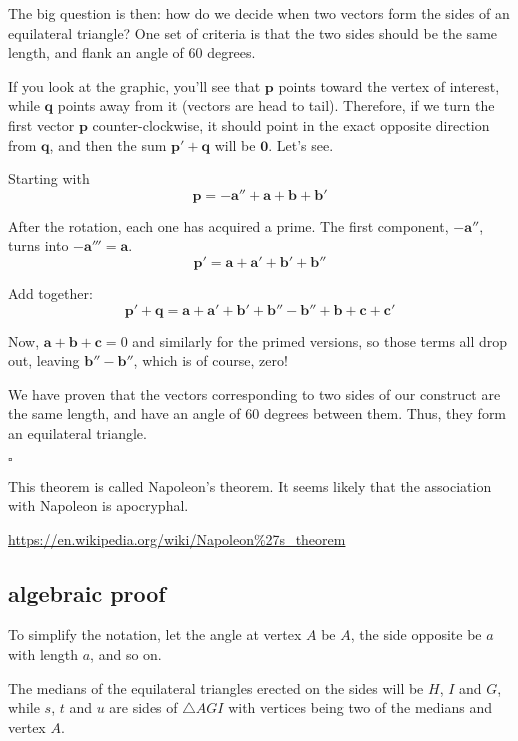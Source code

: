 \documentclass[11pt, oneside]{article}
\begin{document}
The big question is then:  how do we decide when two vectors form the sides of an equilateral triangle?  One set of criteria is that the two sides should be the same length, and flank an angle of 60 degrees.  

If you look at the graphic, you'll see that $\mathbf{p}$ points toward the vertex of interest, while $\mathbf{q}$ points away from it (vectors are head to tail).  Therefore, if we turn the first vector $\mathbf{p}$ counter-clockwise, it should point in the exact opposite direction from $\mathbf{q}$, and then the sum $\mathbf{p'} + \mathbf{q}$ will be $\mathbf{0}$.  Let's see.

Starting with 
\[ \mathbf{p} = \mathbf{-a''} + \mathbf{a} + \mathbf{b} + \mathbf{b'} \]

After the rotation, each one has acquired a prime.  The first component, $\mathbf{-a''}$, turns into $\mathbf{-a'''} = \mathbf{a}$.
\[ \mathbf{p'} = \mathbf{a} + \mathbf{a'} + \mathbf{b'} + \mathbf{b''} \]

Add together:
\[ \mathbf{p'} + \mathbf{q} = \mathbf{a} + \mathbf{a'} + \mathbf{b'} + \mathbf{b''} - \mathbf{b''} + \mathbf{b} + \mathbf{c} + \mathbf{c'} \]

Now, $\mathbf{a} + \mathbf{b} + \mathbf{c} = 0$ and similarly for the primed versions, so those terms all drop out, leaving $\mathbf{b''} - \mathbf{b''}$, which is of course, zero!

We have proven that the vectors corresponding to two sides of our construct are the same length, and have an angle of 60 degrees between them.  Thus, they form an equilateral triangle.

$\square$

This theorem is called Napoleon's theorem.  It seems likely that the association with Napoleon is apocryphal.

\url{https://en.wikipedia.org/wiki/Napoleon%27s_theorem}

\subsection*{algebraic proof}

To simplify the notation, let the angle at vertex $A$ be $A$, the side opposite be $a$ with length $a$, and so on.

The medians of the equilateral triangles erected on the sides will be $H$, $I$ and $G$, while $s$, $t$ and $u$ are sides of $\triangle AGI$ with vertices being two of the medians and vertex $A$.
\end{document}
